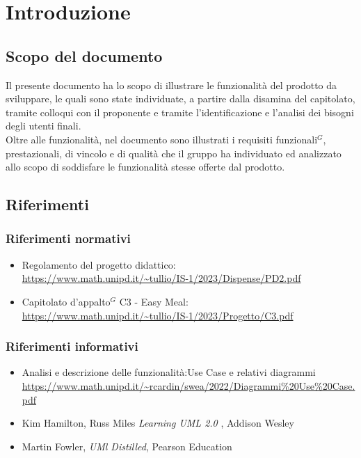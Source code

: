 
\section{Introduzione}

\subsection{Scopo del documento}

Il presente documento ha lo scopo di illustrare le funzionalità del prodotto da sviluppare,
le quali sono state individuate, a partire dalla disamina del capitolato, tramite colloqui con 
il proponente e tramite l'identificazione e l'analisi dei bisogni degli utenti finali.\\
Oltre alle funzionalità, nel documento sono illustrati i requisiti funzionali$^{G}$, prestazionali, di 
vincolo e di qualità che il gruppo ha individuato ed analizzato allo scopo di soddisfare le 
funzionalità stesse offerte dal prodotto. 

\subsection{Riferimenti}
\subsubsection{Riferimenti normativi}

\begin{itemize}
    \item Regolamento del progetto didattico: \\
    \url{https://www.math.unipd.it/~tullio/IS-1/2023/Dispense/PD2.pdf}
    \item Capitolato d’appalto$^{G}$ C3 - Easy Meal: \\
    \url{https://www.math.unipd.it/~tullio/IS-1/2023/Progetto/C3.pdf}
\end{itemize}

\subsubsection{Riferimenti informativi} 

\begin{itemize}
    \item Analisi e descrizione delle funzionalità:Use Case e relativi diagrammi \\
    \url{https://www.math.unipd.it/~rcardin/swea/2022/Diagrammi%20Use%20Case.pdf}
    \item Kim Hamilton, Russ Miles \emph{Learning UML 2.0 }, Addison Wesley \\
    \item Martin Fowler, \emph{UMl Distilled}, Pearson Education

\end{itemize}

